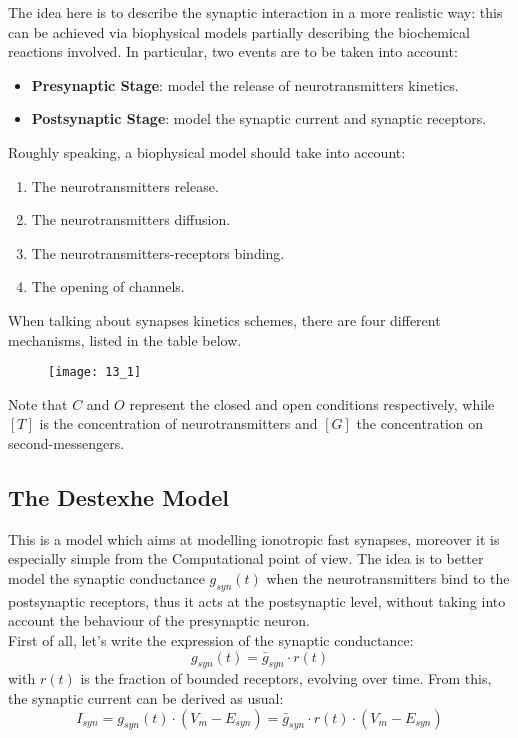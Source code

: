 The idea here is to describe the synaptic interaction in a more
realistic way: this can be achieved via biophysical models
partially describing the biochemical reactions involved. In particular,
two events are to be taken into account:
\begin{itemize}
    \item \textbf{Presynaptic Stage}: model the release of
          neurotransmitters kinetics.
    \item \textbf{Postsynaptic Stage}: model the synaptic current
          and synaptic receptors.
\end{itemize}
Roughly speaking, a biophysical model should take into account:
\begin{enumerate}
    \item The neurotransmitters release.
    \item The neurotransmitters diffusion.
    \item The neurotransmitters-receptors binding.
    \item The opening of channels.
\end{enumerate}
When talking about synapses kinetics schemes, there are four
different mechanisms, listed in the table below.
\begin{figure}[H]
    \texttt{[image: 13\_1]}
    \centering
\end{figure}
Note that \(C\) and \(O\) represent the closed and open conditions
respectively, while \([T]\) is the concentration of neurotransmitters and
\([G]\) the concentration on second-messengers.

\subsection{The Destexhe Model}
This is a model which aims at modelling ionotropic fast synapses, moreover
it is especially simple from the Computational point of view. The idea is to
better model the synaptic conductance \(g_{syn}(t)\) when the
neurotransmitters bind to the postsynaptic receptors, thus it
acts at the postsynaptic level, without taking into account the
behaviour of the presynaptic neuron.\\
First of all, let's write the expression of the synaptic conductance:
\begin{equation*}
    g_{syn}(t)=\bar{g}_{syn}\cdot{r(t)}
\end{equation*}
with \(r(t)\) is the fraction of bounded receptors, evolving over time.
From this, the synaptic current can be derived as usual:
\begin{equation*}
    I_{syn}=g_{syn}(t)\cdot{(V_{m}-E_{syn})}=\bar{g}_{syn}\cdot{r(t)}\cdot{(V_{m}-E_{syn})}
\end{equation*}
